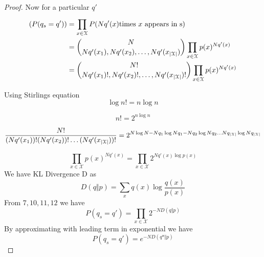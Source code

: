\documentclass[letterpaper,english,12pt]{article}
\begin{document}
\begin{proof} 
  Now for a particular $q'$ 
  \begin{equation}
  \begin{split}
      (P(q_{s}=q')) & =  \prod_{x\in \mathcal{X}}^{} P(Nq'(x) \text{times $x$ appears in s)}\\
      & ={N \choose Nq'(x_1), Nq'(x_2), \dots, Nq'(x_{\left\lvert\mathcal{X}\right\rvert})} \prod_{x \in \mathcal{X}} p(x)^{Nq'(x)}\\
      & ={N! \choose{Nq'(x_1)}!,Nq'(x_2)!,\dots,Nq'(x_{\left\lvert\mathcal{X}\right\rvert})!} \prod_{x \in \mathcal{X}} p(x)^{Nq'(x)}\\
  \end{split}
  \end{equation}
  
  Using Stirlings equation 
  \begin{equation}
  \log n! = n \log n
  \end{equation}
  
  \begin{equation}
    n! = 2^{n\log n}
  \end{equation}
  
  
  \begin{equation}
  \dfrac{N!}{(Nq'(x_1))! (Nq'(x_2))! \dots (Nq'(x_{\left\lvert\mathcal{X}\right\rvert}))!} 
  =  2^{N\log N - Nq_1\log{Nq_1} - Nq_2\log{Nq_2} \dots Nq_{\left\lvert\mathcal{X}\right\rvert} \log{Nq_{\left\lvert\mathcal{X}\right\rvert}}}
  \end{equation}
  
  \begin{equation}
      \prod_{x \in \mathcal{X}} p(x)^{Nq'(x)}= \prod_{x \in \mathcal{X}} 2^{Nq'(x)\log p(x)}
  \end{equation}
  We have KL Divergence D as 
  \begin{equation}
      D(q \Vert p) = \sum_{x}{}q(x)\log \dfrac{q(x)}{p(x)}
  \end{equation}
  From $7,10,11,12$ we have
  \begin{equation}
      P(q_{s}=q') = \prod_{x\in \mathcal{X}}2^{-ND(q \Vert p)}
  \end{equation}
  By approximating with leading term in exponential
  we have 
  \begin{equation}
       P(q_{s}=q') = e^{-ND(q* \Vert p)}
  \end{equation}
  \end{proof}
  
\end{document}
